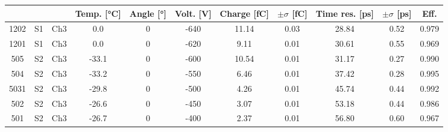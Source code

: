 \begin{tabular}{ccccccccccc}
\toprule
 &  &  & Temp. [°C] & Angle [°] & Volt. [V] & Charge [fC] & \(\pm\sigma\) [fC] & Time res. [ps] & \(\pm\sigma\) [ps] & Eff. \\
\midrule
1202 & S1 & Ch3 & 0.0 & 0 & -640 & 11.14 & 0.03 & 28.84 & 0.52 & 0.979 \\
1201 & S1 & Ch3 & 0.0 & 0 & -620 & 9.11 & 0.01 & 30.61 & 0.55 & 0.969 \\
505 & S2 & Ch3 & -33.1 & 0 & -600 & 10.54 & 0.01 & 31.17 & 0.27 & 0.990 \\
504 & S2 & Ch3 & -33.2 & 0 & -550 & 6.46 & 0.01 & 37.42 & 0.28 & 0.995 \\
5031 & S2 & Ch3 & -29.8 & 0 & -500 & 4.26 & 0.01 & 45.74 & 0.44 & 0.992 \\
502 & S2 & Ch3 & -26.6 & 0 & -450 & 3.07 & 0.01 & 53.18 & 0.44 & 0.986 \\
501 & S2 & Ch3 & -26.7 & 0 & -400 & 2.37 & 0.01 & 56.80 & 0.60 & 0.967 \\
\bottomrule
\end{tabular}
